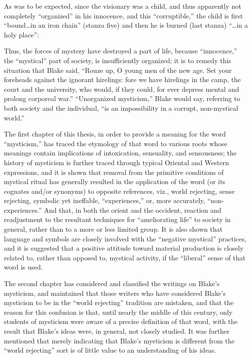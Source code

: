 As was to be expected, since the visionary was a child, and thus apparently not completely \enquote{organized} in his
innocence, and this \enquote{corruptible,} the child is first \enquote{bound\dots in an iron chain} (stanza five) and then he is
burned (last stanza) \enquote{\dots in a holy place}:


Thus, the forces of mystery have destroyed a part of life, because \enquote{innocence,} the \enquote{mystical} part of society,
is insufficiently organized; it is to remedy this situation that Blake said, \enquote{Rouze up, O young men of the new age. Set your foreheads against the ignorant hirelings: fore we have
hirelings in the camp, the court and the university, who would, if they could, for ever depress mental and prolong corporeal war.}\supercite{kazin:portable-blake}
\enquote{Unorganized mysticism,} Blake would say, referring to both society and the individual, \enquote{is an impossibility in a corrupt, non-mystical world.}

The first chapter of this thesis, in order to provide a meaning for the word \enquote{mysticism,} has traced the etymology
of that word to various roots whose meanings contain implications of intoxication, sensuality, and sensousness; the
history of mysticism is further traced through typical Oriental and Western expressions, and it is shown that removal
from the primitive conditions of mystical ritual has generally resulted in the application of the word (or its cognates and/or synonyms) to
opposite references, viz., world rejecting, sense rejecting, symbolic yet ineffable, \enquote{experiences,} or,
more accurately, \enquote{non-experiences.} And that, in both the orient and the occident, reaction and readjustment to the
resultant techniques for \enquote{ameliorating life} to society in general, rather than to a more or less
limited group. It is also shown that language and symbols are closely involved with the \enquote{negative mystical} practices,
and it is suggested that a positive attitude toward material production is closely related to, rather than opposed to,
mystical activity, if the \enquote{liberal} sense of that word is used.

The second chapter has considered and classified the writings on Blake's mysticism, and maintained that those
writers who have considered Blake's mysticism to be in the \enquote{world rejecting} tradition are mistaken,
and that the reason for this confusion is that, until nearly the middle of this century, only students of mysticism were aware of a precise
definition of that word, with the result that Blake's ideas were, in general, not closely studied. It was further mentioned that
merely indicating that Blake's mysticism is different from the \enquote{world rejecting} sort is of little value to an understanding of his ideas.

